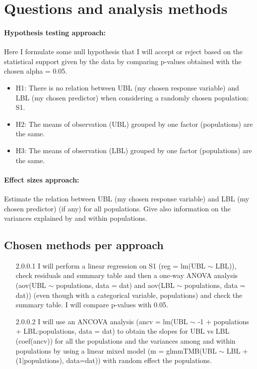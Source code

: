 \documentclass{article}
\begin{document}
\section{Questions and analysis methods}
\paragraph{Hypothesis testing approach:} 
Here I formulate some null hypothesis that I will accept or reject based on the statistical support given by the data by comparing p-values obtained with the chosen alpha = 0.05.
\begin{itemize}
    \item H1: There is no relation between UBL (my chosen response variable) and LBL (my chosen predictor) when considering a randomly chosen population: S1.
    \item H2: The means of observation (UBL) grouped by one factor (populations) are the same.
    \item H3: The means of observation (LBL) grouped by one factor (populations) are the same.
\end{itemize}

\paragraph{Effect sizes approach:}
Estimate the relation between UBL (my chosen response variable) and LBL (my chosen predictor) (if any) for all populations. Give also information on the variances explained by and within populations.


\subsection{Chosen methods per approach}
\begin{enumerate}
    \item[2.0.0.1] I will perform a linear regression on S1 (reg = lm(UBL $\sim$ LBL)), check residuals and summary table and then a one-way ANOVA analysis (aov(UBL $\sim$ populations, data = dat) and aov(LBL $\sim$ populations, data = dat)) (even though with a categorical variable, populations) and check the summary table. I will compare p-values with 0.05.
    \item[2.0.0.2] I will use an ANCOVA analysis (ancv = lm(UBL $\sim$ -1 + populations + LBL:populations, data = dat) to obtain the slopes for UBL vs LBL (coef(ancv)) for all the populations and the variances among and within populations by using a linear mixed model (m = glmmTMB(UBL $\sim$ LBL + (1|populations), data=dat)) with random effect the populations.
\end{enumerate}
\end{document}
